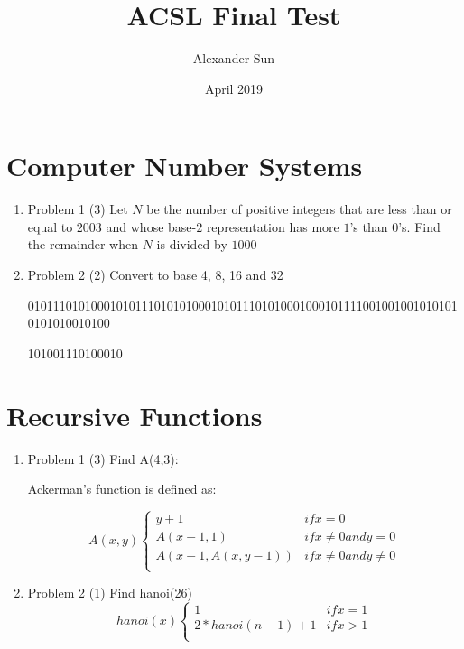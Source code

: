 \documentclass{article}
\title{ACSL Final Test}
\author{Alexander Sun}
\date{April 2019}
\begin{document}
\maketitle

\newpage

\section{Computer Number Systems}
\begin{enumerate}
    \item{Problem 1 (3) Let $N$ be the number of positive integers that are less than or equal to $2003$ and whose base-$2$ representation has more $1$'s than $0$'s. Find the remainder when $N$ is divided by $1000$}
    
    \item{Problem 2 (2) Convert to base 4, 8, 16 and 32}
    
    010111010100010101110101010001010111010100010001011110010010010101010101010010100
    
    101001110100010
\end{enumerate}
\section{Recursive Functions}
\begin{enumerate}

    \item{Problem 1 (3) Find A(4,3):}
    
    Ackerman's function is defined as:

\[ A(x,y)  \left\{
\begin{array}{ll}
      y + 1 & if x = 0 \\
      A(x - 1, 1) & if x \neq 0 and y = 0 \\
      A(x - 1,A(x, y - 1)) & if x \neq 0 and  y \neq 0 \\
\end{array} 
\right. \]

    \item{Problem 2 (1) Find hanoi(26)}
    \[ hanoi(x)  \left\{
\begin{array}{ll}
      1 & if x = 1 \\
      2 * hanoi(n-1) + 1 & if x > 1 \\
      
\end{array} 
\right. \]
\end{enumerate}
\end{document}
